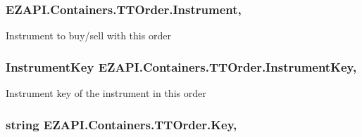 \hypertarget{class_e_z_a_p_i_1_1_containers_1_1_t_t_order_a70ca04ba0abdcc43e85e91529f2240eb}{
\subsubsection[{Instrument}]{ E\-Z\-A\-P\-I.\-Containers.\-T\-T\-Order.\-Instrument\hspace{0.3cm}{\ttfamily [get]}, {\ttfamily [set]}}}\label{class_e_z_a_p_i_1_1_containers_1_1_t_t_order_a70ca04ba0abdcc43e85e91529f2240eb}


Instrument to buy/sell with this order 

\hypertarget{class_e_z_a_p_i_1_1_containers_1_1_t_t_order_a7e8e8a9a7ecbf614117caea02d3318e0}{
\subsubsection[{Instrument\-Key}]{\setlength{\rightskip}{0pt plus 5cm}Instrument\-Key E\-Z\-A\-P\-I.\-Containers.\-T\-T\-Order.\-Instrument\-Key\hspace{0.3cm}{\ttfamily [get]}, {\ttfamily [set]}}}\label{class_e_z_a_p_i_1_1_containers_1_1_t_t_order_a7e8e8a9a7ecbf614117caea02d3318e0}


Instrument key of the instrument in this order 

\hypertarget{class_e_z_a_p_i_1_1_containers_1_1_t_t_order_a1d4d49cfa0a420cc94aa0e499a0805ad}{
\subsubsection[{Key}]{\setlength{\rightskip}{0pt plus 5cm}string E\-Z\-A\-P\-I.\-Containers.\-T\-T\-Order.\-Key\hspace{0.3cm}{\ttfamily [get]}, {\ttfamily [set]}}}\label{class_e_z_a_p_i_1_1_containers_1_1_t_t_order_a1d4d49cfa0a420cc94aa0e499a0805ad}



